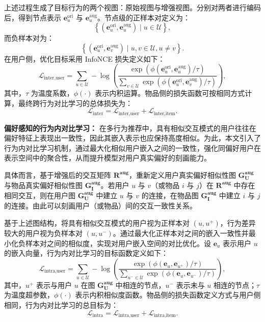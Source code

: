 上述过程生成了目标行为的两个视图：原始视图与增强视图。分别对两者进行编码后，得到节点表示 $\boldsymbol{e}^{\text{ori}}_{u}$ 与 $\boldsymbol{e}^{\text{aug}}_{u}$。节点级的正样本对定义为：
\[
\left\{
(\boldsymbol{e}^{\text{ori}}_{u}, \boldsymbol{e}^{\text{aug}}_{u}) \mid u \in \mathcal{U}
\right\},
\]
而负样本对为：
\[
\left\{
(\boldsymbol{e}^{\text{ori}}_{u}, \boldsymbol{e}^{\text{aug}}_{v}) \mid u, v \in \mathcal{U}, u \ne v
\right\}.
\]
在用户侧，优化目标采用 InfoNCE 损失定义如下：
\begin{equation}
    \mathcal{L}_{\text{inter,user}} =
    \sum_{u \in \mathcal{U}}
    -\log
    \left(
    \frac{
    \exp\left(\phi(\boldsymbol{e}^{\text{ori}}_{u}, \boldsymbol{e}^{\text{aug}}_{u}) / \tau\right)
    }{
    \sum_{v \in \mathcal{U}}
    \exp\left(\phi(\boldsymbol{e}^{\text{ori}}_{u}, \boldsymbol{e}^{\text{aug}}_{v}) / \tau\right)
    }
    \right),
\end{equation}
其中，$\tau$ 为温度系数，$\phi(\cdot)$ 表示内积运算。物品侧的损失函数可按相同方式计算，最终跨行为对比学习的总体损失为：
\begin{equation}
    \mathcal{L}_{\text{inter}} = 
    \mathcal{L}_{\text{inter,user}} + 
    \mathcal{L}_{\text{inter,item}}.
\end{equation}

\textbf{偏好感知的行为内对比学习：}
在多行为推荐中，具有相似交互模式的用户往往在偏好特征上表现出一致性，因此其嵌入表示也应保持高度相似。为此，本文引入了行为内对比学习机制，通过最大化相似用户嵌入之间的一致性，强化同偏好用户在表示空间中的聚合性，从而提升模型对用户真实偏好的刻画能力。

具体而言，基于增强后的交互矩阵 $\boldsymbol{R^{aug}}$，重新定义用户真实偏好相似性图 $\boldsymbol{G^{aug}_{U}}$ 与物品真实偏好相似性图 $\boldsymbol{G^{aug}_{I}}$。若用户 $u$ 与 $v$（或物品 $i$ 与 $j$）在 $\boldsymbol{R^{aug}}$ 中存在相同交互，则在用户图 $\boldsymbol{G^{aug}_{U}}$ 中建立 $u$ 与 $v$ 的连接，在物品图 $\boldsymbol{G^{aug}_{I}}$ 中建立 $i$ 与 $j$ 的连接。由此可以刻画用户（或物品）间的交互一致性关系。

基于上述图结构，将具有相似交互模式的用户视为正样本对 $(u, u^+)$，行为差异较大的用户视为负样本对 $(u, u^-)$。通过最大化正样本对之间的嵌入一致性并最小化负样本对之间的相似度，实现对用户嵌入空间的对比优化。设 $\boldsymbol{e}_u$ 表示用户 $u$ 的嵌入向量，行为内对比学习的目标函数定义如下：
\begin{equation}
    \mathcal{L}_{\text{intra,user}} = 
    \sum_{u \in \mathcal{U}} 
    -\log
    \left(
    \frac{
    \exp\left(\phi(\boldsymbol{e}_{u}, \boldsymbol{e}_{u^{+}}) / \tau\right)
    }{
    \sum_{u^{-} \in \mathcal{U}} 
    \exp\left(\phi(\boldsymbol{e}_{u}, \boldsymbol{e}_{u^{-}}) / \tau\right)
    }
    \right),
\end{equation}
其中，$u^{+}$ 表示与用户 $u$ 在图 $\boldsymbol{G^{aug}_U}$ 中相连的节点，$u^{-}$ 表示未与 $u$ 相连的节点；$\tau$ 为温度超参数，$\phi(\cdot)$ 表示内积相似度函数。物品侧的损失函数定义方式与用户侧相同，行为内对比学习的总目标为：
\begin{equation}
    \mathcal{L}_{\text{intra}} = 
    \mathcal{L}_{\text{intra,user}} + 
    \mathcal{L}_{\text{intra,item}}.
\end{equation}

